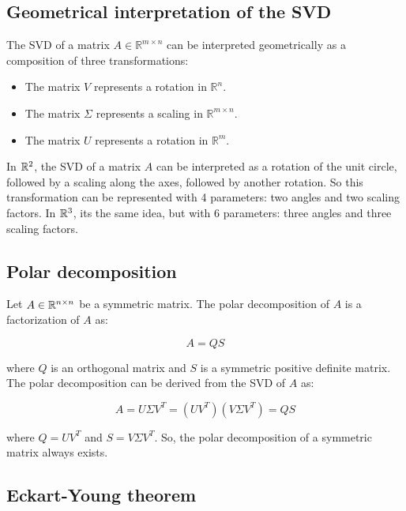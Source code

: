 \subsection{Geometrical interpretation of the SVD}

The SVD of a matrix $A \in \mathbb{R}^{m \times n}$ can be interpreted geometrically as a composition of three transformations:

\begin{itemize}
    \item The matrix $V$ represents a rotation in $\mathbb{R}^n$.
    \item The matrix $\Sigma$ represents a scaling in $\mathbb{R}^{m \times n}$.
    \item The matrix $U$ represents a rotation in $\mathbb{R}^m$.
\end{itemize}

In $\mathbb{R}^2$, the SVD of a matrix $A$ can be interpreted as a rotation of the unit circle, followed by a scaling along the axes, 
followed by another rotation. So this transformation can be represented with 4 parameters: two angles and two scaling factors.
In $\mathbb{R}^3$, its the same idea, but with 6 parameters: three angles and three scaling factors.

\subsection{Polar decomposition}

Let $A \in \mathbb{R}^{n \times n}$ be a symmetric matrix. The polar decomposition of $A$ is a factorization of $A$ as:

\begin{equation}
    A = Q S
\end{equation}

where $Q$ is an orthogonal matrix and $S$ is a symmetric positive definite matrix. 
The polar decomposition can be derived from the SVD of $A$ as:

\begin{equation}
    A = U \Sigma V^T = (U V^T) (V \Sigma V^T) = Q S
\end{equation}

where $Q = U V^T$ and $S = V \Sigma V^T$. So, the polar decomposition of a symmetric matrix
always exists.

\subsection{Eckart-Young theorem}

